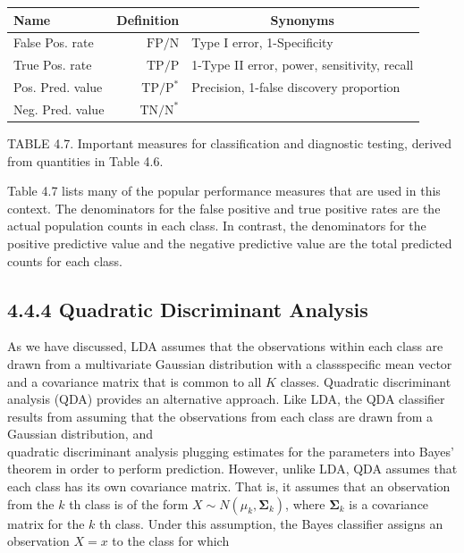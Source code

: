 \documentclass[10pt]{article}
\begin{document}
\begin{center}
\begin{tabular}{l|r|l}
\hline
Name & Definition & \multicolumn{1}{c}{Synonyms} \\
\hline
False Pos. rate & $\mathrm{FP} / \mathrm{N}$ & Type I error, 1-Specificity \\
True Pos. rate & $\mathrm{TP} / \mathrm{P}$ & 1-Type II error, power, sensitivity, recall \\
Pos. Pred. value & $\mathrm{TP} / \mathrm{P}^{*}$ & Precision, 1-false discovery proportion \\
Neg. Pred. value & $\mathrm{TN} / \mathrm{N}^{*}$ &  \\
\hline
\end{tabular}
\end{center}

TABLE 4.7. Important measures for classification and diagnostic testing, derived from quantities in Table 4.6.

Table 4.7 lists many of the popular performance measures that are used in this context. The denominators for the false positive and true positive rates are the actual population counts in each class. In contrast, the denominators for the positive predictive value and the negative predictive value are the total predicted counts for each class.

\subsection*{4.4.4 Quadratic Discriminant Analysis}
As we have discussed, LDA assumes that the observations within each class are drawn from a multivariate Gaussian distribution with a classspecific mean vector and a covariance matrix that is common to all $K$ classes. Quadratic discriminant analysis (QDA) provides an alternative approach. Like LDA, the QDA classifier results from assuming that the observations from each class are drawn from a Gaussian distribution, and\\
quadratic discriminant analysis plugging estimates for the parameters into Bayes' theorem in order to perform prediction. However, unlike LDA, QDA assumes that each class has its own covariance matrix. That is, it assumes that an observation from the $k$ th class is of the form $X \sim N\left(\mu_{k}, \boldsymbol{\Sigma}_{k}\right)$, where $\boldsymbol{\Sigma}_{k}$ is a covariance matrix for the $k$ th class. Under this assumption, the Bayes classifier assigns an observation $X=x$ to the class for which
\end{document}
